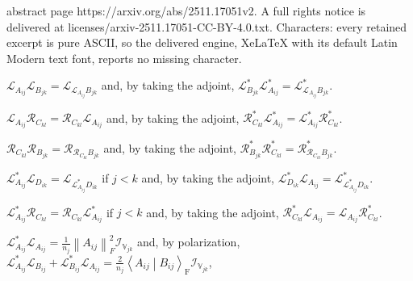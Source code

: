 \documentclass[10pt,a4paper]{amsart}
\begin{document}
abstract page https://arxiv.org/abs/2511.17051v2. A full rights notice is delivered at licenses/arxiv-2511.17051-CC-BY-4.0.txt. Characters: every retained excerpt is pure ASCII, so the delivered engine, XeLaTeX with its default Latin Modern text font, reports no missing character.
\begin{enumerate}[label={[\Alph*]},
ref={[\Alph*]}]
\item\label{identity:leftleft}%
$\mathcal{L}_{A_{ij}} \mathcal{L}_{B_{jk}} =
\mathcal{L}_{\mathcal{L}_{A_{ij}} B_{jk}}$ and, by taking the adjoint,
$\mathcal{L}^{*}_{B_{jk}} \mathcal{L}^{*}_{A_{ij}} =
\mathcal{L}^{*}_{\mathcal{L}_{A_{ij}} B_{jk}}$.

\item\label{identity:leftright}%
$\mathcal{L}_{A_{ij}} \mathcal{R}_{C_{kl}} = \mathcal{R}_{C_{kl}}
\mathcal{L}_{A_{ij}}$ and, by taking the adjoint, $\mathcal{R}^{*}_{C_{kl}}
\mathcal{L}^{*}_{A_{ij}} = \mathcal{L}^{*}_{A_{ij}}
\mathcal{R}^{*}_{C_{kl}}$.

\item\label{identity:rightright}%
$\mathcal{R}_{C_{kl}} \mathcal{R}_{B_{jk}} =
\mathcal{R}_{\mathcal{R}_{C_{kl}} B_{jk}}$ and, by taking the adjoint,
$\mathcal{R}^{*}_{B_{jk}} \mathcal{R}^{*}_{C_{kl}} =
\mathcal{R}^{*}_{\mathcal{R}_{C_{kl}} B_{jk}}$.

\item\label{identity:leftadjointleft}%
$\mathcal{L}^{*}_{A_{ij}} \mathcal{L}_{D_{ik}} =
\mathcal{L}_{\mathcal{L}^{*}_{A_{ij}} D_{ik}}$ if $j < k$ and, by taking
the adjoint, $\mathcal{L}^{*}_{D_{ik}} \mathcal{L}_{A_{ij}} =
\mathcal{L}^{*}_{\mathcal{L}^{*}_{A_{ij}} D_{ik}}$.

\item\label{identity:leftadjointright}%
$\mathcal{L}^{*}_{A_{ij}} \mathcal{R}_{C_{kl}} = \mathcal{R}_{C_{kl}}
\mathcal{L}^{*}_{A_{ij}}$ if $j < k$ and, by taking the adjoint,
$\mathcal{R}^{*}_{C_{kl}} \mathcal{L}_{A_{ij}} = \mathcal{L}_{A_{ij}}
\mathcal{R}^{*}_{C_{kl}}$.

\end{enumerate}

\begin{enumerate}[label={[\Alph*]},
ref={[\Alph*]}]
\addtocounter{enumi}{6}%
\item\label{identity:leftadjointself}%
$\mathcal{L}^{*}_{A_{ij}} \mathcal{L}_{A_{ij}} = \frac{1}{n_{j}}
\left\lVert A_{ij}\right\rVert_{F}^{2} \mathcal{I}_{\mathbb{V}_{jk}}$ and,
by polarization, $\mathcal{L}^{*}_{A_{ij}} \mathcal{L}_{B_{ij}} +
\mathcal{L}^{*}_{B_{ij}} \mathcal{L}_{A_{ij}} = \frac{2}{n_{j}}
\left\langle A_{ij} \middle| B_{ij} \right\rangle_{\mathrm{F}}
\mathcal{I}_{\mathbb{V}_{jk}}$,

\end{enumerate}
\end{document}
